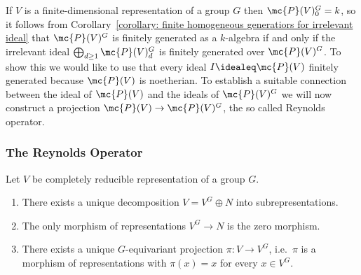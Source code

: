 \begin{fluff}
  If $V$ is a finite-dimensional representation of a group $G$ then $\mc{P}(V)^G_0 = k$, so it follows from Corollary~\ref{corollary: finite homogeneous generatiors for irrelevant ideal} that $\mc{P}(V)^G$ is finitely generated as a $k$-algebra if and only if the irrelevant ideal $\bigoplus_{d \geq 1} \mc{P}(V)^G_d$ is finitely generated over $\mc{P}(V)^G$.
  To show this we would like to use that every ideal $I \idealeq \mc{P}(V)$ finitely generated because $\mc{P}(V)$ is noetherian.
  To establish a suitable connection between the ideal of $\mc{P}(V)$ and the ideals of $\mc{P}(V)^G$ we will now construct a projection $\mc{P}(V) \to \mc{P}(V)^G$, the so called Reynolds operator.
\end{fluff}



\subsubsection{The Reynolds Operator}


\begin{proposition}
  \label{proposition: existence and uniqueness of Reynolds operators}
  Let $V$ be completely reducible representation of a group $G$.
  \begin{enumerate}
    \item
      There exists a unique decomposition $V = V^G \oplus N$ into subrepresentations.
    \item
      The only morphism of representations $V^G \to N$ is the zero morphism.
    \item
      There exists a unique $G$-equivariant projection $\pi \colon V \to V^G$, i.e.\ $\pi$ is a morphism of representations with $\pi(x) = x$ for every $x \in V^G$.
  \end{enumerate}
\end{proposition}


